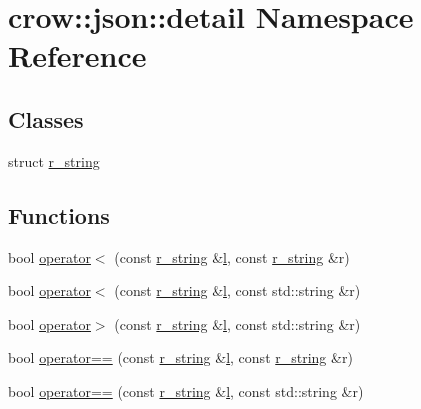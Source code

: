 \hypertarget{namespacecrow_1_1json_1_1detail}{\section{crow\-:\-:json\-:\-:detail Namespace Reference}
\label{namespacecrow_1_1json_1_1detail}
}
\subsection*{Classes}
\begin{DoxyCompactItemize}
\item 
struct \hyperlink{structcrow_1_1json_1_1detail_1_1r__string}{r\-\_\-string}
\end{DoxyCompactItemize}
\subsection*{Functions}
\begin{DoxyCompactItemize}
\item 
bool \hyperlink{namespacecrow_1_1json_1_1detail_a9e05ef194e02704d74fe40a02f747723}{operator$<$} (const \hyperlink{structcrow_1_1json_1_1detail_1_1r__string}{r\-\_\-string} \&\hyperlink{three_8min_8js_aae3c400cfa9afd0584b6226ac3804a40}{l}, const \hyperlink{structcrow_1_1json_1_1detail_1_1r__string}{r\-\_\-string} \&r)
\item 
bool \hyperlink{namespacecrow_1_1json_1_1detail_a6ebe4a1331b93ac4d1e4f1f169388234}{operator$<$} (const \hyperlink{structcrow_1_1json_1_1detail_1_1r__string}{r\-\_\-string} \&\hyperlink{three_8min_8js_aae3c400cfa9afd0584b6226ac3804a40}{l}, const std\-::string \&r)
\item 
bool \hyperlink{namespacecrow_1_1json_1_1detail_a11f03601163525452ff2d9d08fc669b3}{operator$>$} (const \hyperlink{structcrow_1_1json_1_1detail_1_1r__string}{r\-\_\-string} \&\hyperlink{three_8min_8js_aae3c400cfa9afd0584b6226ac3804a40}{l}, const std\-::string \&r)
\item 
bool \hyperlink{namespacecrow_1_1json_1_1detail_a0c2d17963f4159c72621f429cdf48d95}{operator==} (const \hyperlink{structcrow_1_1json_1_1detail_1_1r__string}{r\-\_\-string} \&\hyperlink{three_8min_8js_aae3c400cfa9afd0584b6226ac3804a40}{l}, const \hyperlink{structcrow_1_1json_1_1detail_1_1r__string}{r\-\_\-string} \&r)
\item 
bool \hyperlink{namespacecrow_1_1json_1_1detail_a2d67be22770ab4c241c39408d6ff766c}{operator==} (const \hyperlink{structcrow_1_1json_1_1detail_1_1r__string}{r\-\_\-string} \&\hyperlink{three_8min_8js_aae3c400cfa9afd0584b6226ac3804a40}{l}, const std\-::string \&r)
\end{DoxyCompactItemize}


